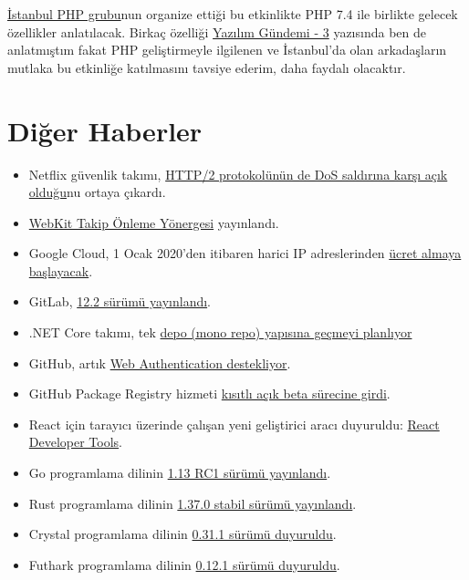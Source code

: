 \documentclass[11pt]{article}
\begin{document}
\href{https://twitter.com/istanbulphp}{İstanbul PHP grubu}nun organize ettiği bu etkinlikte PHP 7.4 ile birlikte
gelecek özellikler anlatılacak. Birkaç özelliği \href{../03/yazilim-gundemi-03.pdf}{Yazılım Gündemi - 3} yazısında
ben de anlatmıştım fakat PHP geliştirmeyle ilgilenen ve İstanbul'da olan
arkadaşların mutlaka bu etkinliğe katılmasını tavsiye ederim, daha faydalı
olacaktır.
\section{Diğer Haberler}
\label{sec:orgb21bb45}
\begin{itemize}
\item Netflix güvenlik takımı, \href{https://github.com/Netflix/security-bulletins/blob/master/advisories/third-party/2019-002.md}{HTTP/2 protokolünün de DoS saldırına karşı açık
olduğu}nu ortaya çıkardı.
\item \href{https://webkit.org/tracking-prevention-policy/}{WebKit Takip Önleme Yönergesi} yayınlandı.
\item Google Cloud, 1 Ocak 2020'den itibaren harici IP adreslerinden \href{https://cloud.google.com/compute/all-pricing\#ipaddress}{ücret almaya
başlayacak}.
\item GitLab, \href{https://about.gitlab.com/2019/08/22/gitlab-12-2-released/}{12.2 sürümü yayınlandı}.
\item .NET Core takımı, tek \href{https://github.com/dotnet/coreclr/issues/26175}{depo (mono repo) yapısına geçmeyi planlıyor}
\item GitHub, artık \href{https://github.blog/2019-08-21-github-supports-webauthn-for-security-keys/}{Web Authentication destekliyor}.
\item GitHub Package Registry hizmeti \href{https://help.github.com/en/articles/about-github-package-registry}{kısıtlı açık beta sürecine girdi}.
\item React için tarayıcı üzerinde çalışan yeni geliştirici aracı duyuruldu: \href{https://reactjs.org/blog/2019/08/15/new-react-devtools.html}{React
Developer Tools}.
\item Go programlama dilinin \href{https://tip.golang.org/doc/go1.13}{1.13 RC1 sürümü yayınlandı}.
\item Rust programlama dilinin \href{https://blog.rust-lang.org/2019/08/15/Rust-1.37.0.html}{1.37.0 stabil sürümü yayınlandı}.
\item Crystal programlama dilinin \href{https://crystal-lang.org/2019/08/12/crystal-0.30.1-released.html}{0.31.1 sürümü duyuruldu}.
\item Futhark programlama dilinin \href{https://futhark-lang.org/blog/2019-08-21-futhark-0.12.1-released.html}{0.12.1 sürümü duyuruldu}.

\end{itemize}
\end{document}
